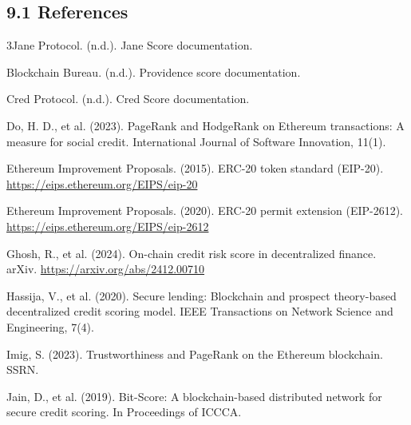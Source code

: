 \subsection*{9.1 References}
\label{sec:references}

\hangindent=0.5in  3Jane Protocol. (n.d.). Jane Score documentation.\par

\hangindent=0.5in  Blockchain Bureau. (n.d.). Providence score documentation.\par

\hangindent=0.5in  Cred Protocol. (n.d.). Cred Score documentation.\par

\hangindent=0.5in  Do, H. D., et al. (2023). PageRank and HodgeRank on Ethereum transactions: A measure for social credit. International Journal of Software Innovation, 11(1).\par

\hangindent=0.5in  Ethereum Improvement Proposals. (2015). ERC-20 token standard (EIP-20). \href{https://eips.ethereum.org/EIPS/eip-20}{https://eips.ethereum.org/EIPS/eip-20}\par

\hangindent=0.5in  Ethereum Improvement Proposals. (2020). ERC-20 permit extension (EIP-2612). \href{https://eips.ethereum.org/EIPS/eip-2612}{https://eips.ethereum.org/EIPS/eip-2612}\par

\hangindent=0.5in  Ghosh, R., et al. (2024). On-chain credit risk score in decentralized finance. arXiv. \href{https://arxiv.org/abs/2412.00710}{https://arxiv.org/abs/2412.00710}\par

\hangindent=0.5in  Hassija, V., et al. (2020). Secure lending: Blockchain and prospect theory-based decentralized credit scoring model. IEEE Transactions on Network Science and Engineering, 7(4).\par

\hangindent=0.5in  Imig, S. (2023). Trustworthiness and PageRank on the Ethereum blockchain. SSRN.\par

\hangindent=0.5in  Jain, D., et al. (2019). Bit-Score: A blockchain-based distributed network for secure credit scoring. In Proceedings of ICCCA.\par

